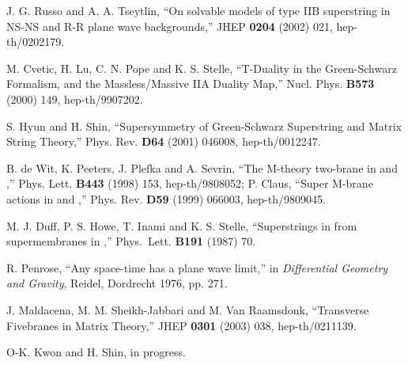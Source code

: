 \documentclass[a4paper,12pt]{article}
\numberwithin{equation}{section}
\begin{document}
\begin{thebibliography}{99}
 J. G. Russo and A. A. Tseytlin, ``On solvable models
  of type IIB superstring in NS-NS and R-R plane wave backgrounds,''
  JHEP {\bf 0204} (2002) 021, hep-th/0202179.

 M. Cvetic, H. Lu, C. N. Pope and K. S. Stelle,
  ``T-Duality in the Green-Schwarz Formalism, and the Massless/Massive
  IIA Duality Map,'' Nucl. Phys. {\bf B573} (2000) 149,
  hep-th/9907202.

 S. Hyun and H. Shin, ``Supersymmetry of Green-Schwarz
  Superstring and Matrix String Theory,'' Phys. Rev. {\bf D64} (2001)
  046008, hep-th/0012247.

 B. de Wit, K. Peeters, J. Plefka and A. Sevrin, ``The
  M-theory two-brane in \coordHE{} and \coordHE{},''
  Phys. Lett. {\bf B443} (1998) 153, hep-th/9808052; P. Claus, ``Super
  M-brane actions in \coordHE{} and \coordHE{},''
  Phys. Rev. {\bf D59} (1999) 066003, hep-th/9809045.

 M. J. Duff, P. S. Howe, T. Inami and K. S. Stelle,
  ``Superstrings in \coordHE{} from supermembranes in \coordHE{},''
  Phys.~Lett.  {\bf B191} (1987) 70.

 R. Penrose, ``Any space-time has a plane wave
  limit,'' in {\it Differential Geometry and Gravity}, Reidel,
  Dordrecht 1976, pp. 271.

 J. Maldacena, M. M. Sheikh-Jabbari and M. Van
  Raamsdonk, ``Transverse Fivebranes in Matrix Theory,'' JHEP {\bf
    0301} (2003) 038, hep-th/0211139.

 O-K. Kwon and H. Shin, in progress.
\end{thebibliography}
\end{document}
